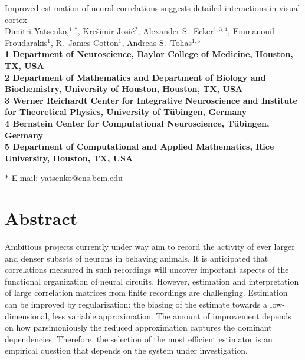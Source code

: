 \documentclass[10pt]{article}
\date{}
\begin{document}
\begin{flushleft}
{\Large
Improved estimation of neural correlations suggests detailed interactions in visual cortex
}
\\
Dimitri Yatsenko,$^{1,\ast}$, 
Kre\v{s}imir Josi\'{c}$^{2}$,
Alexander S.~Ecker$^{1,3,4}$,
Emmanouil Froudarakis$^{1}$,
R.~James Cotton$^{1}$,
Andreas S.~Tolias$^{1,5}$
\\
\bf{1} Department of Neuroscience, Baylor College of Medicine, Houston, TX, USA
\\
\bf{2} Department of Mathematics and Department of Biology and Biochemistry, University of Houston, Houston, TX, USA
\\
\bf{3}  Werner Reichardt Center for Integrative Neuroscience and Institute for Theoretical Physics, University of T\"ubingen, Germany
\\
\bf{4} Bernstein Center for Computational Neuroscience, T\"ubingen, Germany
\\
\bf{5} Department of Computational and Applied Mathematics, Rice University, Houston, TX, USA

$\ast$ E-mail: yatsenko@cns.bcm.edu
\end{flushleft}

\section*{Abstract}
Ambitious projects currently under way aim to record the activity of ever larger and denser subsets of neurons in behaving animals.  It is anticipated that correlations measured in such recordings will uncover important aspects of the functional organization of neural circuits.  However, estimation and interpretation of large correlation matrices from finite recordings are challenging.  Estimation can be improved by regularization: the biasing of the estimate towards a low-dimensional, less variable approximation.  The amount of improvement depends on how parsimoniously the reduced approximation captures the dominant dependencies.  Therefore, the selection of the most efficient estimator is an empirical question that depends on the system under investigation.
\end{document}
